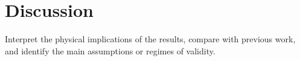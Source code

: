 \section{Discussion}
\label{sec:discussion}

Interpret the physical implications of the results, compare with previous
work, and identify the main assumptions or regimes of validity.
